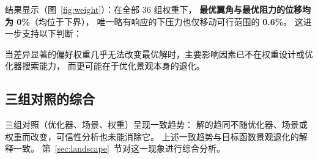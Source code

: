 结果显示（图~\ref{fig:weight}）：在全部 36 组权重下，
\textbf{最优翼角与最优阻力的位移均为 0\%}（均位于下界），
唯一略有响应的下压力也仅移动可行范围的 \textbf{0.6\%}。
这进一步支持以下判断：

\begin{chapterquestion}
当差异显著的偏好权重几乎无法改变最优解时，主要影响因素已不在权重设计或优化器搜索能力，
而更可能在于优化景观本身的退化。
\end{chapterquestion}

\subsection{三组对照的综合}

三组对照（优化器、场景、权重）呈现一致趋势：
解的趋同不随优化器、场景或权重而改变，可信性分析也未能消除它。
上述一致趋势与目标函数景观退化的解释一致。
第~\ref{sec:landscape}~节对这一现象进行综合分析。

